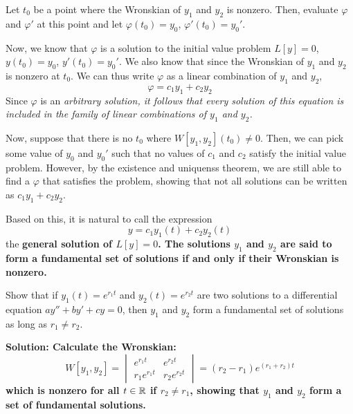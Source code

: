 Let $t_0$ be a point where the Wronskian of $y_1$ and $y_2$ is nonzero.  Then, evaluate $\varphi$ and $\varphi'$ at this point and let $\varphi(t_0) = y_0$, $\varphi'(t_0) = y_0'$. \par
Now, we know that $\varphi$ is a solution to the initial value problem $L[y] = 0$, $y(t_0) = y_0$, $y'(t_0)=y_0'$. We also know that since the Wronskian of $y_1$ and $y_2$ is nonzero at $t_0$. We can thus write $\varphi$ as a linear combination of $y_1$ and $y_2$,
\[ \varphi = c_1y_1 + c_2y_2 \]
Since $\varphi$ is an \it{arbitrary} solution, it follows that every solution of this equation is included in the family of linear combinations of $y_1$ and $y_2$. \par
Now, suppose that there is no $t_0$ where $W[y_1, y_2](t_0) \neq 0$. Then, we can pick some value of $y_0$ and $y_0'$ such that no values of $c_1$ and $c_2$ satisfy the initial value problem. However, by the existence and uniquenss theorem, we are still able to find a $\varphi$ that satisfies the problem, showing that not all solutions can be written as $c_1y_1 + c_2y_2$. \par
Based on this, it is natural to call the expression
\[ y = c_1y_1(t) + c_2y_2(t) \]
the \bf{general solution} of $L[y] = 0$. The solutions $y_1$ and $y_2$ are said to form a \bf{fundamental set of solutions} if and only if their Wronskian is nonzero. 
\begin{example}
    Show that if $y_1(t) = e^{r_1t}$ and $y_2(t) = e^{r_2t}$ are two solutions to a differential equation $ay''+by'+cy=0$, then $y_1$ and $y_2$ form a fundamental set of solutions as long as $r_1\neq r_2$. \par
    \bf{Solution:} Calculate the Wronskian:
    \[ W[y_1, y_2] = \begin{vmatrix}
        e^{r_1t} & e^{r_2t} \\
        r_1e^{r_1t} & r_2e^{r_2t}
    \end{vmatrix} = (r_2-r_1)e^{(r_1+r_2)t}\]
    which is nonzero for all $t\in\mathbb{R}$ if $r_2\neq r_1$, showing that $y_1$ and $y_2$ form a set of fundamental solutions.
\end{example}
